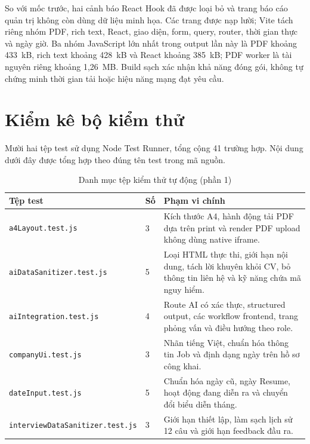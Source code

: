 So với mốc trước, hai cảnh báo React Hook đã được loại bỏ và trang báo cáo quản trị không còn dùng dữ liệu minh họa. Các trang được nạp lười; Vite tách riêng nhóm PDF, rich text, React, giao diện, form, query, router, thời gian thực và ngày giờ. Ba nhóm JavaScript lớn nhất trong output lần này là PDF khoảng 433~kB, rich text khoảng 428~kB và React khoảng 385~kB; PDF worker là tài nguyên riêng khoảng 1,26~MB. Build sạch xác nhận khả năng đóng gói, không tự chứng minh thời gian tải hoặc hiệu năng mạng đạt yêu cầu.

\section{Kiểm kê bộ kiểm thử}

Mười hai tệp test sử dụng Node Test Runner, tổng cộng 41 trường hợp. Nội dung dưới đây được tổng hợp theo đúng tên test trong mã nguồn.

\begin{table}[H]
    \centering
    \footnotesize
    \begin{tabularx}{\textwidth}{|p{}|p{}|Y|} \hline
        \textbf{Tệp test} & \textbf{Số} & \textbf{Phạm vi chính} \\ \hline
        \texttt{a4Layout.test.js} & 3 & Kích thước A4, hành động tải PDF dựa trên print và render PDF upload không dùng native iframe. \\ \hline
        \texttt{aiDataSanitizer.test.js} & 5 & Loại HTML thực thi, giới hạn nội dung, tách lời khuyên khỏi CV, bỏ thông tin liên hệ và kỹ năng chứa mã nguy hiểm. \\ \hline
        \texttt{aiIntegration.test.js} & 4 & Route AI có xác thực, structured output, các workflow frontend, trang phỏng vấn và điều hướng theo role. \\ \hline
        \texttt{companyUi.test.js} & 3 & Nhãn tiếng Việt, chuẩn hóa thông tin Job và định dạng ngày trên hồ sơ công khai. \\ \hline
        \texttt{dateInput.test.js} & 5 & Chuẩn hóa ngày cũ, ngày Resume, hoạt động đang diễn ra và chuyển đổi biểu diễn tháng. \\ \hline
        \texttt{interviewData}\allowbreak\texttt{Sanitizer.test.js} & 3 & Giới hạn thiết lập, làm sạch lịch sử 12 câu và giới hạn feedback đầu ra. \\ \hline
    \end{tabularx}
    \caption{Danh mục tệp kiểm thử tự động (phần 1)}
    \label{tab:test-inventory-part1}
\end{table}

